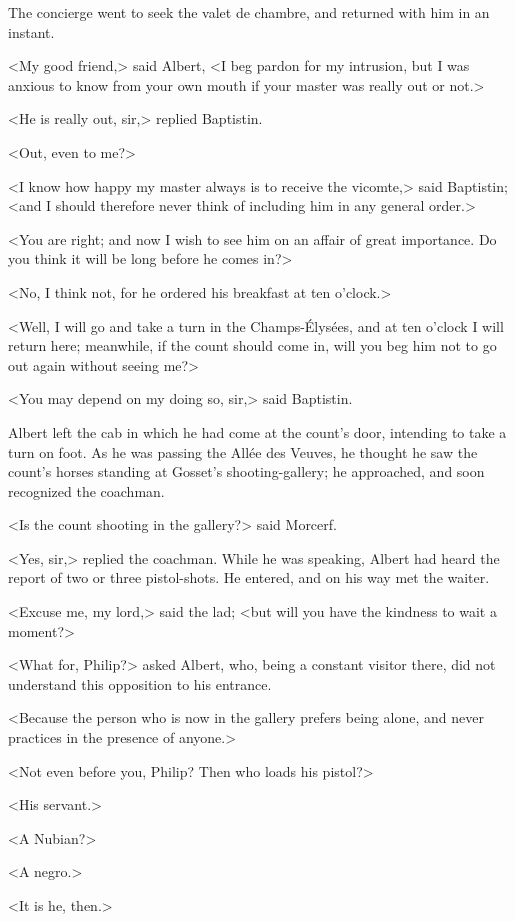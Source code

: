 The concierge went to seek the valet de chambre, and returned with him in an instant. 

 <My good friend,> said Albert, <I beg pardon for my intrusion, but I was anxious to know from your own mouth if your master was really out or not.> 

 <He is really out, sir,> replied Baptistin. 

 <Out, even to me?> 

 <I know how happy my master always is to receive the vicomte,> said Baptistin; <and I should therefore never think of including him in any general order.> 

 <You are right; and now I wish to see him on an affair of great importance. Do you think it will be long before he comes in?> 

 <No, I think not, for he ordered his breakfast at ten o'clock.> 

 <Well, I will go and take a turn in the Champs-Élysées, and at ten o'clock I will return here; meanwhile, if the count should come in, will you beg him not to go out again without seeing me?> 

 <You may depend on my doing so, sir,> said Baptistin. 

 Albert left the cab in which he had come at the count's door, intending to take a turn on foot. As he was passing the Allée des Veuves, he thought he saw the count's horses standing at Gosset's shooting-gallery; he approached, and soon recognized the coachman. 

 <Is the count shooting in the gallery?> said Morcerf. 

 <Yes, sir,> replied the coachman. While he was speaking, Albert had heard the report of two or three pistol-shots. He entered, and on his way met the waiter. 

 <Excuse me, my lord,> said the lad; <but will you have the kindness to wait a moment?> 

 <What for, Philip?> asked Albert, who, being a constant visitor there, did not understand this opposition to his entrance. 

 <Because the person who is now in the gallery prefers being alone, and never practices in the presence of anyone.> 

 <Not even before you, Philip? Then who loads his pistol?> 

 <His servant.> 

 <A Nubian?> 

 <A negro.> 

 <It is he, then.> 

